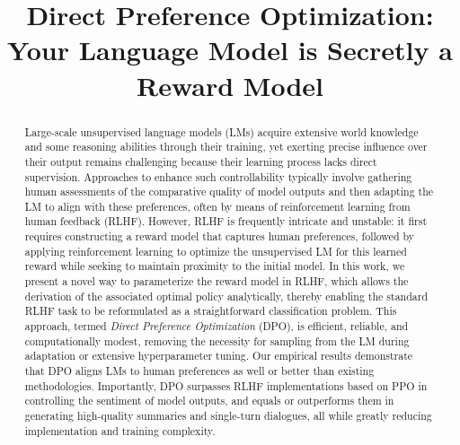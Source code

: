 \title{Direct Preference Optimization: Your Language Model is Secretly a Reward Model}

\begin{abstract}
Large-scale unsupervised language models (LMs) acquire extensive world knowledge and some reasoning abilities through their training, yet exerting precise influence over their output remains challenging because their learning process lacks direct supervision. Approaches to enhance such controllability typically involve gathering human assessments of the comparative quality of model outputs and then adapting the LM to align with these preferences, often by means of reinforcement learning from human feedback (RLHF). However, RLHF is frequently intricate and unstable: it first requires constructing a reward model that captures human preferences, followed by applying reinforcement learning to optimize the unsupervised LM for this learned reward while seeking to maintain proximity to the initial model. In this work, we present a novel way to parameterize the reward model in RLHF, which allows the derivation of the associated optimal policy analytically, thereby enabling the standard RLHF task to be reformulated as a straightforward classification problem. This approach, termed \textit{Direct Preference Optimization} (DPO), is efficient, reliable, and computationally modest, removing the necessity for sampling from the LM during adaptation or extensive hyperparameter tuning. Our empirical results demonstrate that DPO aligns LMs to human preferences as well or better than existing methodologies. Importantly, DPO surpasses RLHF implementations based on PPO in controlling the sentiment of model outputs, and equals or outperforms them in generating high-quality summaries and single-turn dialogues, all while greatly reducing implementation and training complexity.
\end{abstract}

